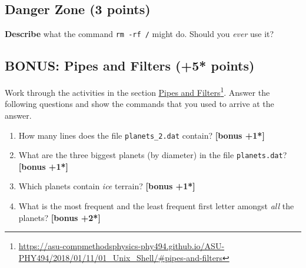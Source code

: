 \documentclass[letterpaper]{scrartcl}
\newcommand{\bonus}[1]{\textbf{[bonus +#1*]}}
\newenvironment{enuma}{\begin{enumerate}[label=(\alph*)]}{\end{enumerate}}
\newcommand{\fnhref}[2]{\href{#1}{#2}\footnote{\url{#1}}}
\begin{document}
\subsection{Danger Zone (3 points)}

\begin{center}
\end{center}
\textbf{Describe} what the command \texttt{rm -rf /} might do. Should
you \emph{ever} use it?

\subsection{BONUS: Pipes and Filters (+5* points)}
\label{sec:pipesandfilters}

Work through the activities in the section
\fnhref{https://asu-compmethodsphysics-phy494.github.io/ASU-PHY494/2018/01/11/01_Unix_Shell/\#pipes-and-filters}{Pipes
  and Filters}. Answer the following questions and show the commands
that you used to arrive at the answer.

\begin{enuma}
\item How many lines does the file \texttt{planets\_2.dat} contain? \bonus{1}
\item What are the three biggest planets (by diameter) in the file
  \texttt{planets.dat}? \bonus{1}
\item Which planets contain \emph{ice} terrain? \bonus{1}
\item \label{li:characters} What is the most frequent and the least
  frequent first letter amongst \emph{all} the planets? \bonus{2}
\end{enuma}
\end{document}
